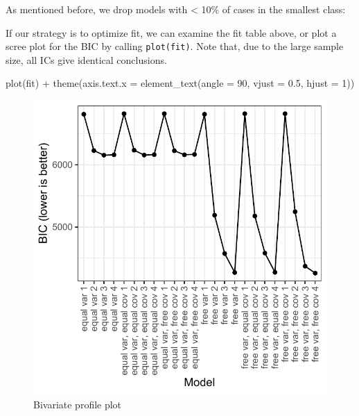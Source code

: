 \documentclass[
  man,floatsintext]{apa6}
\newenvironment{Shaded}{\begin{snugshade}}{\end{snugshade}}
\newcommand{\AttributeTok}[1]{\textcolor[rgb]{0.77,0.63,0.00}{#1}}
\newcommand{\DecValTok}[1]{\textcolor[rgb]{0.00,0.00,0.81}{#1}}
\newcommand{\FloatTok}[1]{\textcolor[rgb]{0.00,0.00,0.81}{#1}}
\newcommand{\FunctionTok}[1]{\textcolor[rgb]{0.00,0.00,0.00}{#1}}
\newcommand{\NormalTok}[1]{#1}
\newcommand{\OtherTok}[1]{\textcolor[rgb]{0.56,0.35,0.01}{#1}}
\newcommand{\SpecialCharTok}[1]{\textcolor[rgb]{0.00,0.00,0.00}{#1}}
\begin{document}
As mentioned before, we drop models with \textless{} 10\% of cases in the smallest class:

\begin{Shaded}
\end{Shaded}

If our strategy is to optimize fit,
we can examine the fit table above,
or plot a scree plot for the BIC by calling \texttt{plot(fit)}.
Note that, due to the large sample size, all ICs give identical conclusions.

\begin{Shaded}
\begin{Highlighting}[]
\FunctionTok{plot}\NormalTok{(fit) }\SpecialCharTok{+} \FunctionTok{theme}\NormalTok{(}\AttributeTok{axis.text.x =} \FunctionTok{element\_text}\NormalTok{(}\AttributeTok{angle =} \DecValTok{90}\NormalTok{, }\AttributeTok{vjust =} \FloatTok{0.5}\NormalTok{,}
    \AttributeTok{hjust =} \DecValTok{1}\NormalTok{))}
\end{Highlighting}
\end{Shaded}

\begin{figure}
\includegraphics[width=1\linewidth]{appendices/gmm_plotfit} \caption{Bivariate profile plot}\label{fig:unnamed-chunk-16}
\end{figure}
\end{document}

